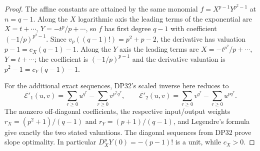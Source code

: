 \documentclass[11pt,a4paper]{article}
\theoremstyle{definition}\newtheorem{remark}[theorem]{Remark}
\begin{document}
\begin{proof}
The affine constants are attained by the same monomial $f=X^{p-1}Y^{p^2-1}$ at $n=q-1$. Along the $X$ logarithmic axis the leading terms of the exponential are $X=t+\cdots$, $Y=-t^p/p+\cdots$, so $f$ has first degree $q-1$ with coefficient $(-1/p)^{p^2-1}$. Since $v_p((q-1)!)=p^2+p-2$, the derivative has valuation $p-1=c_X(q-1)-1$. Along the $Y$ axis the leading terms are $X=-t^{p^2}/p+\cdots$, $Y=t+\cdots$; the coefficient is $(-1/p)^{p-1}$ and the derivative valuation is $p^2-1=c_Y(q-1)-1$.

For the additional exact sequences, DP32's scaled inverse here reduces to
\[
 \overline{\mathcal E'}_1(u,v)=\sum_{r\ge0}u^{q^r}-\sum_{r\ge0}v^{p^2q^r},\qquad
 \overline{\mathcal E'}_2(u,v)=\sum_{r\ge0}v^{q^r}-\sum_{r\ge0}u^{pq^r}.
\]
The nonzero off-diagonal coefficients, the respective input/output weights $r_X=(p^2+1)/(q-1)$ and $r_Y=(p+1)/(q-1)$, and Legendre's formula give exactly the two stated valuations. The diagonal sequences from DP32 prove slope optimality. In particular $D_X^pY(0)=-(p-1)!$ is a unit, while $c_X>0$.
\end{proof}
\end{document}
